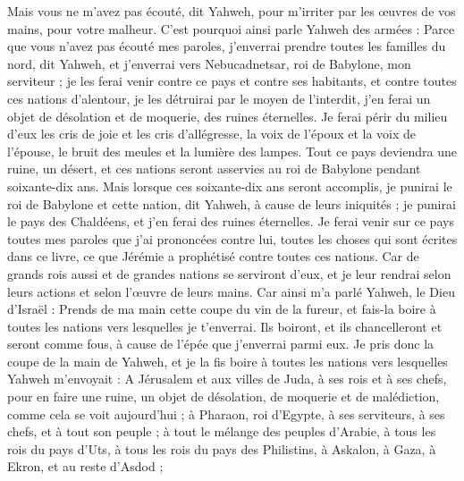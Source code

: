 \begin{multicols}{2}
Mais vous ne m'avez pas écouté, dit Yahweh, pour m'irriter par les œuvres de vos mains, pour votre malheur.
C'est pourquoi ainsi parle Yahweh des armées : Parce que vous n'avez pas écouté mes paroles,
j'enverrai prendre toutes les familles du nord, dit Yahweh, et j'enverrai vers Nebucadnetsar, roi de Babylone, mon serviteur ; je les ferai venir contre ce pays et contre ses habitants, et contre toutes ces nations d'alentour, je les détruirai par le moyen de l'interdit, j'en ferai un objet de désolation et de moquerie, des ruines éternelles.
Je ferai périr du milieu d'eux les cris de joie et les cris d'allégresse, la voix de l'époux et la voix de l'épouse, le bruit des meules et la lumière des lampes.
Tout ce pays deviendra une ruine, un désert, et ces nations seront asservies au roi de Babylone pendant soixante-dix ans.
Mais lorsque ces soixante-dix ans seront accomplis, je punirai le roi de Babylone et cette nation, dit Yahweh, à cause de leurs iniquités ; je punirai le pays des Chaldéens, et j'en ferai des ruines éternelles.
Je ferai venir sur ce pays toutes mes paroles que j'ai prononcées contre lui, toutes les choses qui sont écrites dans ce livre, ce que Jérémie a prophétisé contre toutes ces nations.
Car de grands rois aussi et de grandes nations se serviront d'eux, et je leur rendrai selon leurs actions et selon l'œuvre de leurs mains.
Car ainsi m'a parlé Yahweh, le Dieu d'Israël : Prends de ma main cette coupe du vin de la fureur, et fais-la boire à toutes les nations vers lesquelles je t'enverrai.
Ils boiront, et ils chancelleront et seront comme fous, à cause de l'épée que j'enverrai parmi eux.
Je pris donc la coupe de la main de Yahweh, et je la fis boire à toutes les nations vers lesquelles Yahweh m'envoyait :
A Jérusalem et aux villes de Juda, à ses rois et à ses chefs, pour en faire une ruine, un objet de désolation, de moquerie et de malédiction, comme cela se voit aujourd'hui ;
à Pharaon, roi d'Egypte, à ses serviteurs, à ses chefs, et à tout son peuple ;
à tout le mélange des peuples d'Arabie, à tous les rois du pays d'Uts, à tous les rois du pays des Philistins, à Askalon, à Gaza, à Ekron, et au reste d'Asdod ;

\end{multicols}
